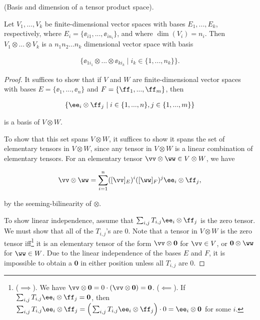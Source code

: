\newpage

\begin{theorem}
\label{ch::motivated_intro::thm::basis_dim_tensor_product_space}
    (Basis and dimension of a tensor product space). 
    
    Let $V_1, ..., V_k$ be finite-dimensional vector spaces with bases $E_1, ..., E_k$, respectively, where $E_i = \{\ee_{i1}, ..., \ee_{in_i}\}$, and where $\dim(V_i) = n_i$. Then $V_1 \otimes ... \otimes V_k$ is a $n_1 n_2 ... n_k$ dimensional vector space with basis
    
    \begin{align*}
        \{ \ee_{1i_1} \otimes ... \otimes \ee_{ki_k} \mid i_k \in \{1, ..., n_k\} \}.
    \end{align*}
\end{theorem}

\begin{proof}
      It suffices to show that if $V$ and $W$ are finite-dimensional vector spaces with bases $E = \{\ee_1, ..., \ee_n\}$ and $F = \{\ff_1, ..., \ff_m\}$, then
      
      \begin{align*}
          \{\ee_i \otimes \ff_j \mid i \in \{1, ..., n\}, j \in \{1, ..., m\} \}
      \end{align*}
      
      is a basis of $V \otimes W$.
      
      To show that this set spans $V \otimes W$, it suffices to show it spans the set of elementary tensors in $V \otimes W$, since any tensor in $V \otimes W$ is a linear combination of elementary tensors. For an elementary tensor $\vv \otimes \ww \in V \otimes W$, we have
      
      \begin{align*}
          \vv \otimes \ww = \sum_{i = 1}^n ([\vv]_E)^i ([\ww]_F)^j \ee_i \otimes \ff_j,
      \end{align*}
      
      by the seeming-bilinearity of $\otimes$.
      
      To show linear independence, assume that $\sum_{i, j} T_{i, j} \ee_i \otimes \ff_j$ is the zero tensor. We must show that all of the $T_{i,j}$'s are $0$. Note that a tensor in $V \otimes W$ is the zero tensor iff\footnote{($\implies$). We have $\vv \otimes \mathbf{0} = 0 \cdot (\vv \otimes \mathbf{0}) = \mathbf{0}$. ($\impliedby$). If $\sum_{i, j} T_{i, j} \ee_i \otimes \ff_j = \mathbf{0}$, then $\sum_{i, j} T_{i, j} \ee_i \otimes \ff_j = \Big(\sum_{i, j} T_{i, j} \ee_i \otimes \ff_j\Big) \cdot 0 = \ee_i \otimes \mathbf{0}$ for some $i$.} it is an elementary tensor of the form $\vv \otimes \mathbf{0}$ for $\vv \in V$, or $\mathbf{0} \otimes \ww$ for $\ww \in W$. Due to the linear independence of the bases $E$ and $F$, it is impossible to obtain a $\mathbf{0}$ in either position unless all $T_{i,j}$ are $0$.
\end{proof}

